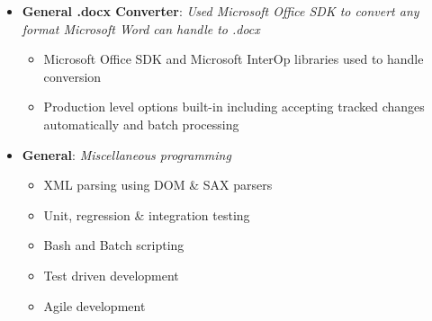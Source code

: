 \documentclass[a3paper]{article}
\newcommand{\ListItem}[2]{
	\item \small \textbf{#1}{: \it #2}
}
\begin{document}
\begin{itemize}[label=\faUsers]
\begin{itemize}[label=\faGears]
		\ListItem{General .docx Converter}{Used Microsoft Office SDK to convert any format Microsoft Word can handle to .docx}
		\begin{itemize}[label=\faGear]
			\item Microsoft Office SDK and Microsoft InterOp libraries used to handle conversion
			\item Production level options built-in including accepting tracked changes automatically and batch processing
		\end{itemize}

		\ListItem{General}{Miscellaneous programming}
		\begin{itemize}[label=\faGear]
			\item XML parsing using DOM \& SAX parsers
			\item Unit, regression \& integration testing
            \item Bash and Batch scripting
			\item Test driven development
			\item Agile development
		\end{itemize}

	\end{itemize}
	
	
	\vspace{1em}
	
\end{itemize}
\end{document}
